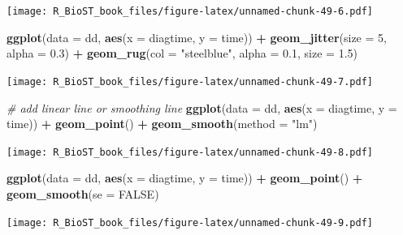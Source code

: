\documentclass[
]{book}
\newenvironment{Shaded}{\begin{snugshade}}{\end{snugshade}}
\newcommand{\CommentTok}[1]{\textcolor[rgb]{0.56,0.35,0.01}{\textit{#1}}}
\newcommand{\DataTypeTok}[1]{\textcolor[rgb]{0.13,0.29,0.53}{#1}}
\newcommand{\DecValTok}[1]{\textcolor[rgb]{0.00,0.00,0.81}{#1}}
\newcommand{\FloatTok}[1]{\textcolor[rgb]{0.00,0.00,0.81}{#1}}
\newcommand{\KeywordTok}[1]{\textcolor[rgb]{0.13,0.29,0.53}{\textbf{#1}}}
\newcommand{\NormalTok}[1]{#1}
\newcommand{\OperatorTok}[1]{\textcolor[rgb]{0.81,0.36,0.00}{\textbf{#1}}}
\newcommand{\OtherTok}[1]{\textcolor[rgb]{0.56,0.35,0.01}{#1}}
\newcommand{\StringTok}[1]{\textcolor[rgb]{0.31,0.60,0.02}{#1}}
\begin{document}
\texttt{[image: R\_BioST\_book\_files/figure-latex/unnamed-chunk-49-6.pdf]}

\begin{Shaded}
\begin{Highlighting}[]
\KeywordTok{ggplot}\NormalTok{(}\DataTypeTok{data =}\NormalTok{ dd, }\KeywordTok{aes}\NormalTok{(}\DataTypeTok{x =}\NormalTok{ diagtime, }\DataTypeTok{y =}\NormalTok{ time)) }\OperatorTok{+}\StringTok{ }
\StringTok{  }\KeywordTok{geom\_jitter}\NormalTok{(}\DataTypeTok{size =} \DecValTok{5}\NormalTok{, }\DataTypeTok{alpha =} \FloatTok{0.3}\NormalTok{) }\OperatorTok{+}\StringTok{ }
\StringTok{  }\KeywordTok{geom\_rug}\NormalTok{(}\DataTypeTok{col =} \StringTok{"steelblue"}\NormalTok{, }\DataTypeTok{alpha =} \FloatTok{0.1}\NormalTok{, }\DataTypeTok{size =} \FloatTok{1.5}\NormalTok{)}
\end{Highlighting}
\end{Shaded}

\texttt{[image: R\_BioST\_book\_files/figure-latex/unnamed-chunk-49-7.pdf]}

\begin{Shaded}
\begin{Highlighting}[]
\CommentTok{\# add linear line or smoothing line}
\KeywordTok{ggplot}\NormalTok{(}\DataTypeTok{data =}\NormalTok{ dd, }\KeywordTok{aes}\NormalTok{(}\DataTypeTok{x =}\NormalTok{ diagtime, }\DataTypeTok{y =}\NormalTok{ time)) }\OperatorTok{+}\StringTok{ }
\StringTok{  }\KeywordTok{geom\_point}\NormalTok{() }\OperatorTok{+}\StringTok{ }
\StringTok{  }\KeywordTok{geom\_smooth}\NormalTok{(}\DataTypeTok{method =} \StringTok{"lm"}\NormalTok{)}
\end{Highlighting}
\end{Shaded}

\texttt{[image: R\_BioST\_book\_files/figure-latex/unnamed-chunk-49-8.pdf]}

\begin{Shaded}
\begin{Highlighting}[]
\KeywordTok{ggplot}\NormalTok{(}\DataTypeTok{data =}\NormalTok{ dd, }\KeywordTok{aes}\NormalTok{(}\DataTypeTok{x =}\NormalTok{ diagtime, }\DataTypeTok{y =}\NormalTok{ time)) }\OperatorTok{+}\StringTok{ }
\StringTok{  }\KeywordTok{geom\_point}\NormalTok{() }\OperatorTok{+}\StringTok{ }
\StringTok{  }\KeywordTok{geom\_smooth}\NormalTok{(}\DataTypeTok{se =} \OtherTok{FALSE}\NormalTok{)}
\end{Highlighting}
\end{Shaded}

\texttt{[image: R\_BioST\_book\_files/figure-latex/unnamed-chunk-49-9.pdf]}
\end{document}
